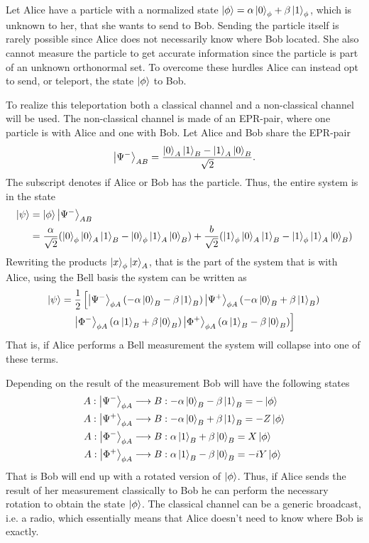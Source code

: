 Let Alice have a particle with a normalized state $\ket{\phi} = \alpha \ket{0}_\phi + \beta \ket{1}_\phi$, which is unknown to her, that she wants to send to Bob. Sending the particle itself is rarely possible since Alice does not necessarily know where Bob located. She also cannot measure the particle to get accurate information since the particle is part of an unknown orthonormal set. To overcome these hurdles Alice can instead opt to send, or teleport, the state $\ket{\phi}$ to Bob. \cite{Bennett:1993}

To realize this teleportation both a classical channel and a non-classical channel will be used. The non-classical channel is made of an EPR-pair, where one particle is with Alice and one with Bob. Let Alice and Bob share the EPR-pair 
\begin{equation}
    \ket{\Psi^-}_{AB} = \frac{\ket{0}_A\ket{1}_B - \ket{1}_A\ket{0}_B}{\sqrt{2}}.
\end{equation}
The subscript denotes if Alice or Bob has the particle. Thus, the entire system is in the state 
\begin{align}
    \ket{\psi} &=\ket{\phi}\ket{\Psi^-}_{AB} \\ &= \frac{\alpha}{\sqrt{2}} (\ket{0}_\phi \ket{0}_A \ket{1}_B - \ket{0}_\phi \ket{1}_A \ket{0}_B) + \frac{b}{\sqrt{2}} (\ket{1}_\phi \ket{0}_A \ket{1}_B - \ket{1}_\phi \ket{1}_A \ket{0}_B)
\end{align}
Rewriting the products $\ket{x}_\phi\ket{x}_A$, that is the part of the system that is with Alice, using the Bell basis the system can be written as 
\begin{multline}
    \ket{\psi} = \frac{1}{2}\left[
        \ket{\Psi^-}_{\phi A} (-\alpha\ket{0}_B - \beta\ket{1}_B)   
        \ket{\Psi^+}_{\phi A} (-\alpha\ket{0}_B + \beta\ket{1}_B)\right.\\
        \left.\ket{\Phi^-}_{\phi A} (\alpha\ket{1}_B + \beta\ket{0}_B)
        \ket{\Phi^+}_{\phi A} (\alpha\ket{1}_B - \beta\ket{0}_B)
        \right]  
\end{multline}
That is, if Alice performs a Bell measurement the system will collapse into one of these terms. \cite{Bennett:1993}

Depending on the result of the measurement Bob will have the following states
\begin{align}
    A: \ket{\Psi^-}_{\phi A} &\longrightarrow B: -\alpha\ket{0}_B - \beta \ket{1}_B = -\ket{\phi}\\
    A: \ket{\Psi^+}_{\phi A} &\longrightarrow B: -\alpha\ket{0}_B + \beta \ket{1}_B = -Z\ket{\phi}\\
    A: \ket{\Phi^-}_{\phi A} &\longrightarrow B: \alpha\ket{1}_B + \beta \ket{0}_B = X\ket{\phi}\\
    A: \ket{\Phi^+}_{\phi A} &\longrightarrow B: \alpha\ket{1}_B - \beta \ket{0}_B = -iY\ket{\phi}\\
\end{align}
That is Bob will end up with a rotated version of $\ket{\phi}$. Thus, if Alice sends the result of her measurement classically to Bob he can perform the necessary rotation to obtain the state $\ket{\phi}$. The classical channel can be a generic broadcast, i.e. a radio, which essentially means that Alice doesn't need to know where Bob is exactly. 
